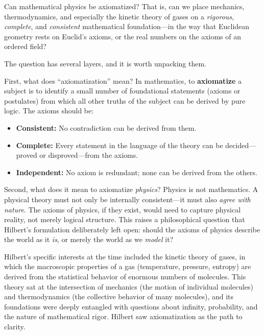 \begin{problem_statement}
Can mathematical physics be axiomatized? That is, can we place mechanics, thermodynamics, and especially the kinetic theory of gases on a \emph{rigorous}, \emph{complete}, and \emph{consistent} mathematical foundation---in the way that Euclidean geometry rests on Euclid's axioms, or the real numbers on the axioms of an ordered field?
\end{problem_statement}

The question has several layers, and it is worth unpacking them.

First, what does ``axiomatization'' mean? In mathematics, to \textbf{axiomatize} a subject is to identify a small number of foundational statements (axioms or postulates) from which all other truths of the subject can be derived by pure logic. The axioms should be:

\begin{itemize}
    \item \textbf{Consistent:} No contradiction can be derived from them.
    \item \textbf{Complete:} Every statement in the language of the theory can be decided---proved or disproved---from the axioms.
    \item \textbf{Independent:} No axiom is redundant; none can be derived from the others.
\end{itemize}

Second, what does it mean to axiomatize \emph{physics}? Physics is not mathematics. A physical theory must not only be internally consistent---it must also \emph{agree with nature}. The axioms of physics, if they exist, would need to capture physical reality, not merely logical structure. This raises a philosophical question that Hilbert's formulation deliberately left open: should the axioms of physics describe the world as it \emph{is}, or merely the world as we \emph{model} it?

Hilbert's specific interests at the time included the kinetic theory of gases, in which the macroscopic properties of a gas (temperature, pressure, entropy) are derived from the statistical behavior of enormous numbers of molecules. This theory sat at the intersection of mechanics (the motion of individual molecules) and thermodynamics (the collective behavior of many molecules), and its foundations were deeply entangled with questions about infinity, probability, and the nature of mathematical rigor. Hilbert saw axiomatization as the path to clarity.

